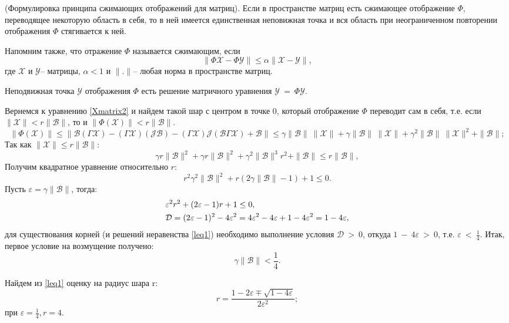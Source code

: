 (Формулировка принципа сжимающих отображений для матриц). Если в пространстве матриц есть сжимающее отображение $\Phi$, переводящее некоторую область в себя, то в ней имеется единственная неповижная точка и вся область при неограниченном повторении отображения $\Phi$ стягивается к ней.

Напомним также, что отражение $\Phi$ называется сжимающим, если
$$
\|\Phi\mathcal{X}-\Phi\mathcal{Y}\|\leq \alpha\|\mathcal{X-Y}\|,
$$
где $\mathcal{X}$ и $\mathcal{Y}$-- матрицы, $\alpha < 1$ и $\|.\|$-- любая норма в пространстве матриц.

Неподвижная точка $\mathcal{Y}$ отображения $\Phi$ есть решение матричного уравнения $\mathcal{Y}~=~\Phi\mathcal{Y}$.

Вернемся к уравнению \eqref{Xmatrix2} и найдем такой шар с центром в точке 0, который отображение $\Phi$ переводит сам в себя, т.е. если $\|\mathcal{X}\|<r\|\mathcal{B}\|$, то и $\|\Phi(\mathcal{X})\|<r\|\mathcal{B}\|$.
$$
\|\Phi(\mathcal{X})\|\leq \|\mathcal{B}(\Gamma\mathcal{X})-(\Gamma\mathcal{X})(\mathcal{JB})-(\Gamma\mathcal{X})\mathcal{J}(\mathcal{B}\Gamma\mathcal{X})+\mathcal{B}\|\leq \gamma \|\mathcal{B}\|~ \|\mathcal{X}\|+\gamma \|\mathcal{B}\|~ \|\mathcal{X}\|+\gamma^2 \|\mathcal{B}\|~ \|\mathcal{X}\|^2 + \|\mathcal{B}\|;
$$
Так как $\|\mathcal{X}\| \leq r\|\mathcal{B}\|$:
$$
\gamma r \|\mathcal{B}\|^2+\gamma r \|\mathcal{B}\|^2+\gamma^2 \|\mathcal{B}\|^3 r^2 + \|\mathcal{B}\| \leq r\|\mathcal{B}\|,
$$
Получим квадратное уравнение относительно $r$:
$$
r^2 \gamma^2 \|\mathcal{B}\|^2 + r (2\gamma \|\mathcal{B}\|-1)+1 \leq 0.
$$
Пусть $\varepsilon=\gamma \|\mathcal{B}\|$, тогда:
\begin{align}
&\varepsilon^2 r^2 + (2 \varepsilon - 1)r + 1 \leq 0,\\ \label{leq1}
&\mathcal{D}=(2\varepsilon-1)^2 - 4\varepsilon^2 = 4\varepsilon^2-4\varepsilon+1-4\varepsilon^2=1-4\varepsilon, \notag
\end{align}
для существования корней (и решений неравенства \eqref{leq1}) необходимо выполнение условия $\mathcal{D}~>~0$, откуда $1~-~4\varepsilon~>~0$, т.е. $\varepsilon~<~\frac{1}{4}$.
Итак, первое условие на возмущение получено:
\begin{equation}\label{cond1}
\gamma \|\mathcal{B}\| < \frac{1}{4}.
\end{equation}

Найдем из \eqref{leq1} оценку на радиус шара r:
$$
r=\frac{1-2\varepsilon\mp\sqrt{1-4\varepsilon}}{2\varepsilon^2};
$$
при $\varepsilon=\frac{1}{4}, r=4.$